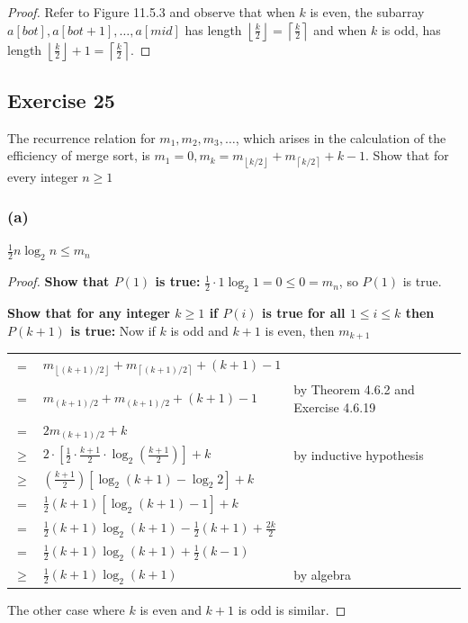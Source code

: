 \documentclass[14pt]{extarticle}
\newcommand{\dps}{\displaystyle}
\newcommand{\cy}{\color{cyan}}
\newcommand{\floor}[1]{{\left\lfloor#1\right\rfloor}}
\newcommand{\ceil}[1]{{\left\lceil#1\right\rceil}}
\begin{document}
\begin{proof}
Refer to Figure 11.5.3 and observe that when \(k\) is even, the subarray \(a[bot], a[bot + 1], \ldots, a[mid]\) has length 
\(\floor{\frac{k}{2}} = \ceil{\frac{k}{2}}\) and when \(k\) is odd, has length \(\floor{\frac{k}{2}}+1=\ceil{\frac{k}{2}}\).
\end{proof}

\subsection{Exercise 25}
The recurrence relation for \(m_1, m_2, m_3, \ldots\), which arises in the calculation of the efficiency of merge sort, is 
\(m_1 = 0, m_k = m_{\floor{k/2}} + m_{\ceil{k/2}} + k - 1\). Show that for every integer \(n \geq 1\) 

\subsubsection{(a)}
\(\frac{1}{2} n \log_2 n \leq m_n\)
\begin{proof}
{\bf Show that \(P(1)\) is true:} \(\frac{1}{2} \cdot 1 \log_2 1 = 0 \leq 0 = m_n\), so \(P(1)\) is true.

{\bf Show that for any integer \(k \geq 1\) if \(P(i)\) is true for all \(1 \leq i \leq k\) then \(P(k+1)\) is true:}
Now if \(k\) is odd and \(k+1\) is even, then \(m_{k+1}\) 

\begin{tabular}{cll}
= & \(m_{\floor{(k+1)/2}} + m_{\ceil{(k+1)/2}} + (k+1) - 1\) & \\
= & \(m_{(k+1)/2} + m_{(k+1)/2} + (k+1) - 1\) & {\cy by Theorem 4.6.2 and Exercise 4.6.19} \\
= & \(2m_{(k+1)/2} + k\) & \\
\(\geq\) & \(\dps 2 \cdot \left[\frac{1}{2} \cdot \frac{k+1}{2} \cdot \log_2\left(\frac{k+1}{2}\right)\right] + k\) & 
{\cy by inductive hypothesis} \\
\(\geq\) & \(\dps \left(\frac{k+1}{2}\right)[\log_2(k+1) - \log_2 2] + k\) & \\
= & \(\frac{1}{2}(k+1)[\log_2(k+1) - 1] + k\) & \\
= & \(\frac{1}{2}(k+1)\log_2(k+1) - \frac{1}{2}(k+1) + \frac{2k}{2}\) & \\
= & \(\frac{1}{2}(k+1)\log_2(k+1) + \frac{1}{2}(k-1)\) & \\
\(\geq\) & \(\frac{1}{2}(k+1)\log_2(k+1)\) & {\cy by algebra} \\
\end{tabular}

The other case where \(k\) is even and \(k+1\) is odd is similar.
\end{proof}
\end{document}

